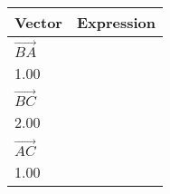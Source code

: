 

\begin{tabularx}{\textwidth}{|X|X|}
\hline
\textbf{Vector} & \textbf{Expression} \\
\hline
$\overrightarrow{BA}$ & 
\[
\begin{bmatrix} 
2.00 \\ 
1.00 
\end{bmatrix} 
\] \\
\hline
$\overrightarrow{BC}$ & 
\[
\begin{bmatrix} 
3.00 \\ 
2.00 
\end{bmatrix} 
\] \\
\hline
$\overrightarrow{AC}$ & 
\[
\begin{bmatrix} 
1.00 \\ 
1.00 
\end{bmatrix} 
\] \\                                         
\hline
\end{tabularx}

